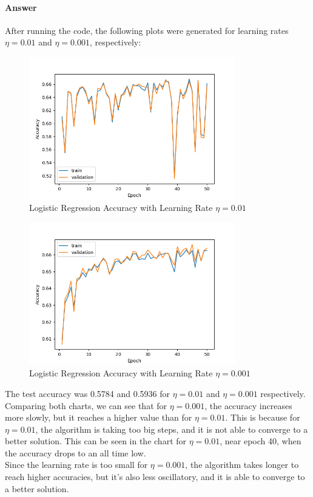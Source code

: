 \documentclass{article}
\begin{document}
\paragraph{Answer} After running the code, the following plots were generated for learning rates $\eta = 0.01$ and $\eta = 0.001$, respectively:
\begin{figure}[H]
    \centering
    \includegraphics[width=0.8\textwidth]{"plots/1_1_b_001.png"}
    \caption{Logistic Regression Accuracy with Learning Rate $\eta = 0.01$}
    \label{1.1.b 0.01 Plot}
\end{figure}

\begin{figure}[H]
    \centering
    \includegraphics[width=0.8\textwidth]{"plots/1_1_b_0001.png"}
    \caption{Logistic Regression Accuracy with Learning Rate $\eta= 0.001$}
    \label{1.1.b 0.0001 Plot}
\end{figure}

The test accuracy was 0.5784 and 0.5936 for $\eta = 0.01$ and $\eta = 0.001$ respectively.\\
Comparing both charts, we can see that for $\eta = 0.001$, the accuracy increases more slowly, but it reaches a higher value than for $\eta = 0.01$. 
This is because for $\eta = 0.01$, the algorithm is taking too big steps, and it is not able to converge to a better solution. This can be 
seen in the chart for $\eta = 0.01$, near epoch 40, when the accuracy drops to an all time low.\\
Since the learning rate is too small for $\eta = 0.001$, the algorithm takes longer to reach higher accuracies, but it's also 
less oscillatory, and it is able to converge to a better solution.\\
\end{document}

